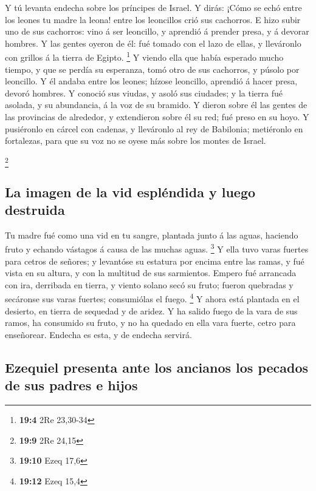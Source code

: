  Y tú levanta endecha sobre los príncipes de Israel.
 Y dirás: ¡Cómo se echó entre los leones tu madre la leona!
entre los leoncillos crió sus cachorros.  E hizo subir uno
de sus cachorros: vino á ser leoncillo, y aprendió á prender presa, y á
devorar hombres.  Y las gentes oyeron de él: fué tomado con
el lazo de ellas, y lleváronlo con grillos á la tierra de Egipto.
\footnote{\textbf{19:4} 2Re 23,30-34}  Y viendo ella que
había esperado mucho tiempo, y que se perdía su esperanza, tomó otro de
sus cachorros, y púsolo por leoncillo.  Y él andaba entre
los leones; hízose leoncillo, aprendió á hacer presa, devoró hombres.
 Y conoció sus viudas, y asoló sus ciudades; y la tierra fué
asolada, y su abundancia, á la voz de su bramido.  Y dieron
sobre él las gentes de las provincias de alrededor, y extendieron sobre
él su red; fué preso en su hoyo.  Y pusiéronlo en cárcel con
cadenas, y lleváronlo al rey de Babilonia; metiéronlo en fortalezas,
para que su voz no se oyese más sobre los montes de Israel.

\footnote{\textbf{19:9} 2Re 24,15}

\hypertarget{la-imagen-de-la-vid-espluxe9ndida-y-luego-destruida}{%
\subsection{La imagen de la vid espléndida y luego
destruida}\label{la-imagen-de-la-vid-espluxe9ndida-y-luego-destruida}}

 Tu madre fué como una vid en tu sangre, plantada junto á
las aguas, haciendo fruto y echando vástagos á causa de las muchas
aguas. \footnote{\textbf{19:10} Ezeq 17,6}  Y ella tuvo
varas fuertes para cetros de señores; y levantóse su estatura por encima
entre las ramas, y fué vista en su altura, y con la multitud de sus
sarmientos.  Empero fué arrancada con ira, derribada en
tierra, y viento solano secó su fruto; fueron quebradas y secáronse sus
varas fuertes; consumiólas el fuego. \footnote{\textbf{19:12} Ezeq 15,4}
 Y ahora está plantada en el desierto, en tierra de
sequedad y de aridez.  Y ha salido fuego de la vara de sus
ramos, ha consumido su fruto, y no ha quedado en ella vara fuerte, cetro
para enseñorear. Endecha es esta, y de endecha servirá.

\hypertarget{ezequiel-presenta-ante-los-ancianos-los-pecados-de-sus-padres-e-hijos}{%
\subsection{Ezequiel presenta ante los ancianos los pecados de sus
padres e
hijos}\label{ezequiel-presenta-ante-los-ancianos-los-pecados-de-sus-padres-e-hijos}}

